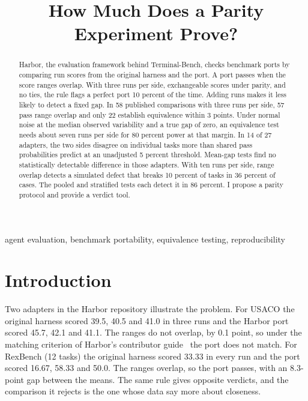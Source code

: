 \documentclass[conference]{IEEEtran}
\begin{document}
\title{How Much Does a Parity Experiment Prove?}

\author{
}

\maketitle

\begin{abstract}
Harbor, the evaluation framework behind Terminal-Bench, checks benchmark ports by comparing run scores from the original harness and the port. A port passes when the score ranges overlap. With three runs per side, exchangeable scores under parity, and no ties, the rule flags a perfect port 10 percent of the time. Adding runs makes it less likely to detect a fixed gap. In 58 published comparisons with three runs per side, 57 pass range overlap and only 22 establish equivalence within 3 points. Under normal noise at the median observed variability and a true gap of zero, an equivalence test needs about seven runs per side for 80 percent power at that margin. In 14 of 27 adapters, the two sides disagree on individual tasks more than shared pass probabilities predict at an unadjusted 5 percent threshold. Mean-gap tests find no statistically detectable difference in those adapters. With ten runs per side, range overlap detects a simulated defect that breaks 10 percent of tasks in 36 percent of cases. The pooled and stratified tests each detect it in 86 percent. I propose a parity protocol and provide a verdict tool.
\end{abstract}

\begin{IEEEkeywords}
agent evaluation, benchmark portability, equivalence testing, reproducibility
\end{IEEEkeywords}

\section{Introduction}

Two adapters in the Harbor repository illustrate the problem. For USACO the original harness scored 39.5, 40.5 and 41.0 in three runs and the Harbor port scored 45.7, 42.1 and 41.1. The ranges do not overlap, by 0.1 point, so under the matching criterion of Harbor's contributor guide~\cite{harbor_contributing} the port does not match. For RexBench (12 tasks) the original harness scored 33.33 in every run and the port scored 16.67, 58.33 and 50.0. The ranges overlap, so the port passes, with an 8.3-point gap between the means. The same rule gives opposite verdicts, and the comparison it rejects is the one whose data say more about closeness.
\end{document}
